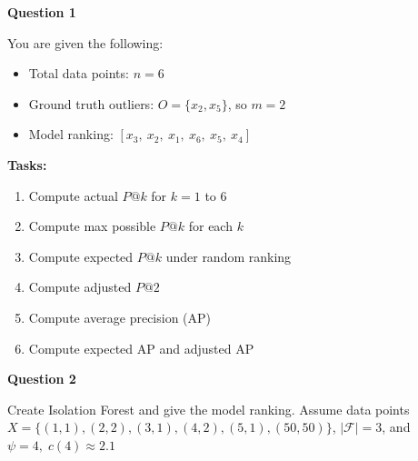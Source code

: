 \documentclass{article}
\begin{document}
\newpage
{}

\textbf{Question 1}

You are given the following:

\begin{itemize}
  \item Total data points: $n = 6$
  \item Ground truth outliers: $O = \{x_2, x_5\}$, so $m = 2$
  \item Model ranking: $[x_3,\ x_2,\ x_1,\ x_6,\ x_5,\ x_4]$
\end{itemize}

\textbf{Tasks:}
\begin{enumerate}
  \item Compute actual $P@k$ for $k = 1$ to $6$
  \item Compute max possible $P@k$ for each $k$
  \item Compute expected $P@k$ under random ranking
  \item Compute adjusted $P@2$
  \item Compute average precision (AP)
  \item Compute expected AP and adjusted AP
\end{enumerate}

\vspace{1 em}
\textbf{Question 2}

Create Isolation Forest and give the model ranking. Assume data points $X=\{(1,1),(2,2),(3,1),(4,2),(5,1),(50,50)\}$, $|\mathcal{F}|=3$, and $\psi=4,\;c(4)\approx2.1$
\end{document}
